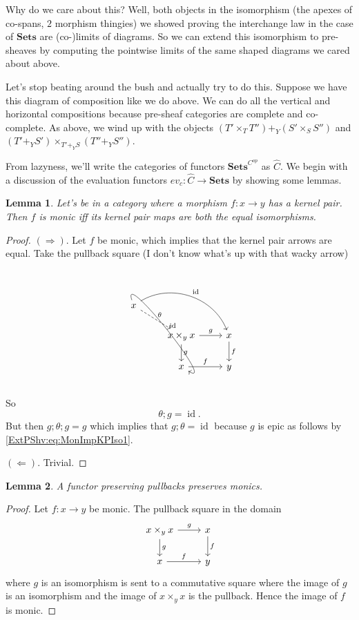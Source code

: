\documentclass[12pt]{article}
\newcommand{\from}{\colon}
\renewcommand{\(}{\left(}
\renewcommand{\)}{\right)}
\renewcommand{\{}{\left\lbrace}
\renewcommand{\}}{\right\rbrace}
\DeclareMathOperator{\id}{id}
\newtheorem*{lem}{Lemma}
\theoremstyle{remark}
\theoremstyle{definition}
\begin{document}
Why do we care about this?  Well, both objects in the isomorphism (the apexes of co-spans, $2$ morphism thingies) we showed proving the interchange law in the case of $\mathbf{Sets}$ are  (co-)limits of diagrams.  So we can extend this isomorphism to pre-sheaves by computing the pointwise limits of the same shaped diagrams we cared about above.  

Let's stop beating around the bush and actually try to do this.  Suppose we have this diagram of composition like we do above.  We can do all the vertical and horizontal compositions because pre-sheaf categories are complete and co-complete.  As above, we wind up with the objects $(T' \times_T T'') +_Y (S' \times_S S'')$ and $(T' +_Y S') \times_{T' +_Y S} (T'' +_Y S'')$.

From lazyness, we'll write the categories of functors $\mathbf{Sets}^{C^{op}}$ as $\widehat{C}$. We begin with a discussion of the evaluation functors $ev_c \from \widehat{C} \to \mathbf{Sets}$ by showing some lemmas.

\begin{lem}
	Let's be in a category where a morphism $f \from x \to y$ has a kernel pair. Then $f$ is monic iff its kernel pair maps are both the equal isomorphisms.
\end{lem}  
\begin{proof}
	$(\Rightarrow)$.  Let $f$ be monic, which implies that the kernel pair arrows are equal.  Take the pullback square (I don't know what's up with that wacky arrow)
	\[
		\begin{tikzcd}
			{x} 
				\ar[rdd,bend right=20em,"\id"]
				\ar[rd, dashed,"\theta"]
				\ar[rrd,bend left=5em, "\id"] &
			{} &
			{} \\
			{} &
			{x \times_y x} 
				\ar[r, "g"]
				\ar[d,"g"] &
			{x} 
				\ar[d,"f"]\\
			{} &
			{x} 
				\ar[r,"f"]&
			{y}
		\end{tikzcd}
	\]
	So 
	\begin{equation} \label{ExtPShv:eq:MonImpKPIso1}
		\theta;g = \id.
	\end{equation}
	But then $g;\theta;g=g$ which implies that $g;\theta=\id$ because $g$ is epic as follows by \eqref{ExtPShv:eq:MonImpKPIso1}.
	
	$(\Leftarrow)$.  Trivial.  
\end{proof}

\begin{lem}
	A functor preserving pullbacks preserves monics.
\end{lem}
\begin{proof}
	Let $f \from x \to y$ be monic. The pullback square in the domain
	\[
		\begin{tikzcd}
			{x \times_y x} 
				\ar[r,"g"]
				\ar[d,"g"] &
			{x}
				\ar[d,"f"]\\
			{x} 
				\ar[r,"f"]&
			{y}
		\end{tikzcd}
	\]
	where $g$ is an isomorphism is sent to a commutative square where the image of $g$ is an isomorphism and the image of $x \times_y x$ is the pullback. Hence the image of $f$ is monic.
\end{proof}
\end{document}

